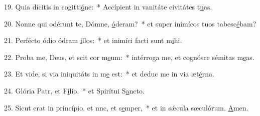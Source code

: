 19. Quia dícitis in cogitti\uline{ó}ne:~* Accípient in vanitáte civitátes t\uline{u}as.\par 
20. Nonne qui odérunt te, Dómne, \uline{ó}deram?~* et super inimícos tuos tabesc\uline{é}bam?\par 
21. Perfécto ódio ódram \uline{i}llos:~* et inimíci facti sunt m\uline{i}hi.\par 
22. Proba me, Deus, et scit cor m\uline{e}um:~* intérroga me, et cognósce sémitas m\uline{e}as.\par 
23. Et vide, si via iniquitáts in m\uline{e} est:~* et deduc me in via æt\uline{é}rna.\par 
24. Glória Patr, et F\uline{í}lio,~* et Spirítui S\uline{a}ncto.\par 
25. Sicut erat in princípio, et nnc, et s\uline{e}mper,~* et in sǽcula sæculórum. \uline{A}men.\par 
